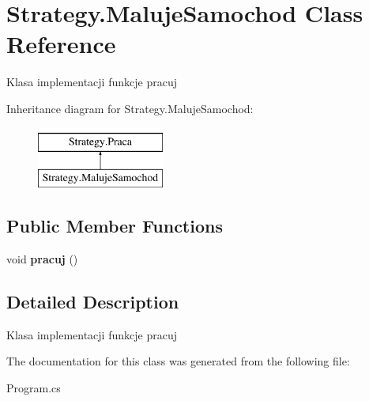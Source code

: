 \hypertarget{class_strategy_1_1_maluje_samochod}{}\section{Strategy.\+Maluje\+Samochod Class Reference}
\label{class_strategy_1_1_maluje_samochod}


Klasa implementacji funkcje pracuj  


Inheritance diagram for Strategy.\+Maluje\+Samochod\+:\begin{figure}[H]
\begin{center}
\leavevmode
\includegraphics[height=2.000000cm]{class_strategy_1_1_maluje_samochod}
\end{center}
\end{figure}
\subsection*{Public Member Functions}
\begin{DoxyCompactItemize}
\item 
\mbox{\label{class_strategy_1_1_maluje_samochod_a9848285874a8eb2da53b5ca69323ffc7}} 
void {\bfseries pracuj} ()
\end{DoxyCompactItemize}


\subsection{Detailed Description}
Klasa implementacji funkcje pracuj 



The documentation for this class was generated from the following file\+:\begin{DoxyCompactItemize}
\item 
Program.\+cs\end{DoxyCompactItemize}
